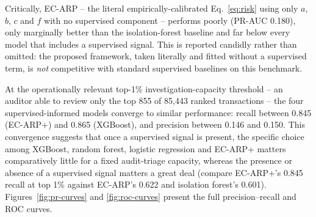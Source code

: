\documentclass[preprint,12pt]{elsarticle}
\begin{document}
Critically, EC-ARP -- the literal empirically-calibrated Eq.~\eqref{eq:risk} using only $a$, $b$, $c$ and $f$ with no supervised component -- performs poorly (PR-AUC 0.180), only marginally better than the isolation-forest baseline and far below every model that includes a supervised signal. This is reported candidly rather than omitted: the proposed framework, taken literally and fitted without a supervised term, is \emph{not} competitive with standard supervised baselines on this benchmark.

\begin{table}[!t]
\caption{Model Comparison on the Held-Out Test Set (30\% stratified split, $n=85{,}443$). Sorted by PR-AUC.}
\label{tab:model-comparison}
\centering
\scriptsize
\setlength{\tabcolsep}{4pt}
\end{table}

At the operationally relevant top-1\% investigation-capacity threshold -- an auditor able to review only the top 855 of 85,443 ranked transactions -- the four supervised-informed models converge to similar performance: recall between 0.845 (EC-ARP+) and 0.865 (XGBoost), and precision between 0.146 and 0.150. This convergence suggests that once a supervised signal is present, the specific choice among XGBoost, random forest, logistic regression and EC-ARP+ matters comparatively little for a fixed audit-triage capacity, whereas the presence or absence of a supervised signal matters a great deal (compare EC-ARP+'s 0.845 recall at top 1\% against EC-ARP's 0.622 and isolation forest's 0.601). Figures~\ref{fig:pr-curves} and \ref{fig:roc-curves} present the full precision--recall and ROC curves.
\end{document}
